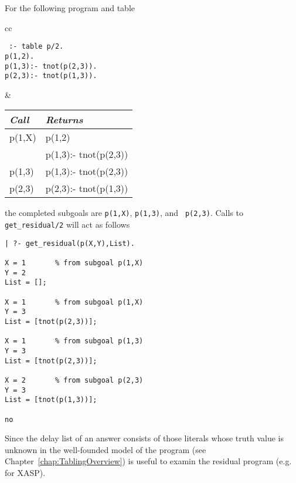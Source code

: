 \begin{description}
\begin{example}
For the following program and table
     \begin{center}
     \begin{tabular}{cc}
     \begin{minipage}{2.1in}
     {\tt
          :- table p/2. \\
          p(1,2). \\
          p(1,3):- tnot(p(2,3)). \\
          p(2,3):- tnot(p(1,3)). 
     }
     \end{minipage}
     &
     \begin{tabular}{||l|l||}   \hline
     {\em Call}                 & {\em Returns} \\ \hline \hline
     p(1,X)                     & p(1,2) \\ 
                                & p(1,3):- tnot(p(2,3)) \\ \hline
     p(1,3)                     & p(1,3):- tnot(p(2,3)) \\ \hline
     p(2,3)                     & p(2,3):- tnot(p(1,3)) \\ \hline
     \end{tabular}
     \end{tabular}
     \end{center}
the completed subgoals are {\tt p(1,X)}, {\tt p(1,3)}, and {\tt
p(2,3)}.  Calls to {\tt get\_residual/2} will act as follows
%
\begin{center}
\begin{small}
\begin{verbatim} 
| ?- get_residual(p(X,Y),List).

X = 1       % from subgoal p(1,X)
Y = 2
List = [];

X = 1       % from subgoal p(1,X)
Y = 3
List = [tnot(p(2,3))];

X = 1       % from subgoal p(1,3)
Y = 3
List = [tnot(p(2,3))];

X = 2       % from subgoal p(2,3)
Y = 3
List = [tnot(p(1,3))];

no
\end{verbatim}
\end{small}
\end{center}
\end{example}

Since the delay list of an answer consists of those literals whose
truth value is unknown in the well-founded model of the program (see
Chapter~\ref{chap:TablingOverview})  is useful
to examin the residual program (e.g. for XASP).


\end{description}
